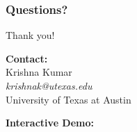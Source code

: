 \documentclass[notes]{beamer}
\begin{document}
\begin{frame}
\frametitle{Questions?}

\centering
\Large Thank you!

\vspace{2cm}

\textbf{Contact:} \\
Krishna Kumar \\
\textit{krishnak@utexas.edu} \\
University of Texas at Austin

\vspace{1cm}

\textbf{Interactive Demo:} \\
\href{https://colab.research.google.com/github/kks32-courses/sciml/blob/main/lectures/03-diffsim/diffsim.ipynb}{}

\end{frame}
\end{document}
